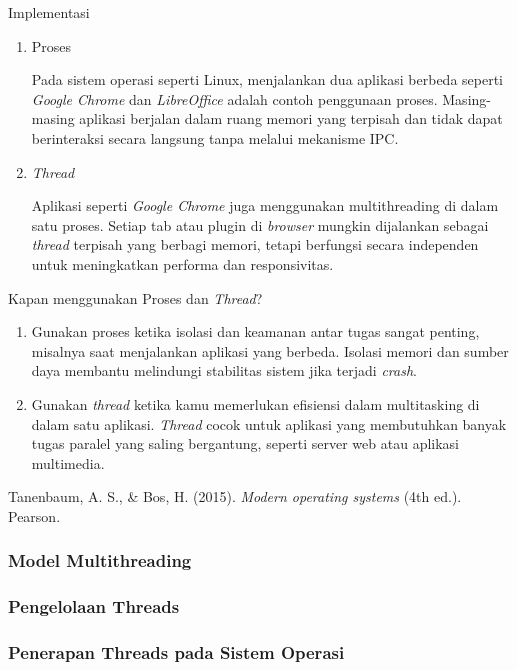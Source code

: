\documentclass[12pt]{article}
\begin{document}
\item Implementasi
      \begin{enumerate}
	      \item Proses

	            Pada sistem operasi seperti Linux, menjalankan dua aplikasi berbeda seperti \textit{Google Chrome} dan \textit{LibreOffice} adalah contoh penggunaan proses. Masing-masing aplikasi berjalan dalam ruang memori yang terpisah dan tidak dapat berinteraksi secara langsung tanpa melalui mekanisme IPC.
	      \item \textit{Thread}

	            Aplikasi seperti \textit{Google Chrome} juga menggunakan multithreading di dalam satu proses. Setiap tab atau plugin di \textit{browser} mungkin dijalankan sebagai \textit{thread} terpisah yang berbagi memori, tetapi berfungsi secara independen untuk meningkatkan performa dan responsivitas.
      \end{enumerate}
\item Kapan menggunakan Proses dan \textit{Thread}?
      \begin{enumerate}
	      \item Gunakan proses ketika isolasi dan keamanan antar tugas sangat penting, misalnya saat menjalankan aplikasi yang berbeda. Isolasi memori dan sumber daya membantu melindungi stabilitas sistem jika terjadi \textit{crash}.
	      \item Gunakan \textit{thread} ketika kamu memerlukan efisiensi dalam multitasking di dalam satu aplikasi. \textit{Thread} cocok untuk aplikasi yang membutuhkan banyak tugas paralel yang saling bergantung, seperti server web atau aplikasi multimedia.
      \end{enumerate}



Tanenbaum, A. S., \& Bos, H. (2015). \textit{Modern operating systems} (4th ed.). Pearson.

\subsubsection{Model Multithreading}
\subsubsection{Pengelolaan Threads}
\subsubsection{Penerapan Threads pada Sistem Operasi}
\end{document}
